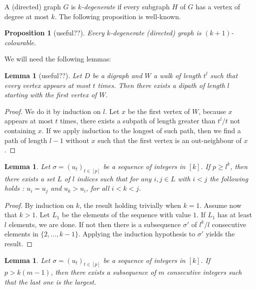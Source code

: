 \documentclass[utf8,10pt]{article}
\theoremstyle{plain}
\newtheorem{lemma}[theorem]{Lemma}
\newtheorem{proposition}[theorem]{Proposition}
\theoremstyle{definition}
\theoremstyle{remark}
\begin{document}
A (directed) graph $G$ is {\it $k$-degenerate} if every subgraph $H$ of $G$ has a vertex of degree at most $k$.
The following proposition is well-known.
\begin{proposition}[useful??]\label{prop:deg}
Every $k$-degenerate (directed) graph is $(k+1)$-colourable.
\end{proposition}





We will need the following lemmas:

\begin{lemma}[useful??]\label{walk}
Let $D$ be a digraph and $W$ a walk of length $t^l$ such that every vertex appears at most $t$ times.
Then there exists a dipath of length $l$ starting with the first vertex of $W$.
\end{lemma}

\begin{proof}
We do it by induction on $l$. Let $x$ be the first vertex of $W$, because $x$ appears at most $t$ times, there exists a subpath of length greater
than $t^l/t$ not containing $x$. If we apply induction to the longest of such path, then we find a path of length $l-1$ without $x$ such that
 the first vertex is an out-neighbour of $x$.

\end{proof}

\begin{lemma}\label{min}
Let $\sigma=(u_t)_{t\in [p]}$ be a sequence of integers in $[k]$. If $p\geq l^k$, then there exists a set $L$ of $l$ indices such that for any $i,j \in L$ with $i < j$ the following holds : $u_i=u_j$ and $u_k > u_i$, for all $i < k < j$.
\end{lemma}

\begin{proof}
By induction on $k$, the result holding trivially when $k=1$. Assume now that $k>1$. Let $L_1$ be the elements of the sequence with value $1$. If $L_1$ has at least $l$ elements, we are done.
If not then there is a subsequence $\sigma'$ of $l^k/l$ consecutive elements in $\{2, \dots , k-1\}$. Applying the induction hypothesis to $\sigma'$ yields the result.
\end{proof}

\begin{lemma}\label{max}
Let $\sigma=(u_t)_{t\in [p]}$ be a sequence of integers in $[k]$. 
If $p > k (m-1)$, then there exists a subsequence of $m$ consecutive integers such that the
last one is the largest.
\end{lemma}
\end{document}
